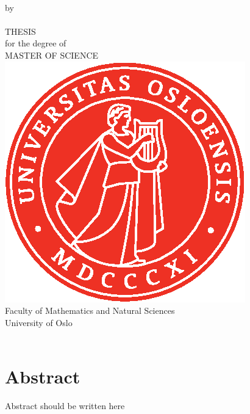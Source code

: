 \thispagestyle{empty}
\begin{center} \vspace{1cm}
    \textbf{\Large{\mtitle}}\\ \vspace{0.5cm}
    \small{by}\\ \vspace{0.5cm}
    \large{\mauthor}\\ \vspace{4.4cm}
    \large{THESIS}\\ \vspace{0.3cm}
    \small{for the degree of}\\ \vspace{0.3cm}
    \large{MASTER OF SCIENCE}\\ \vspace{0.7cm}
    \includegraphics[scale=1.0]{UiO_Segl_pms485.eps} \\ \vspace{0.5cm}
    \large{Faculty of Mathematics and Natural Sciences \\ University of Oslo} \\ \vspace{0.5cm}
    \small{\mdate}\\ \vfill
\end{center}

\newpage
\section*{Abstract}
    Abstract should be written here

